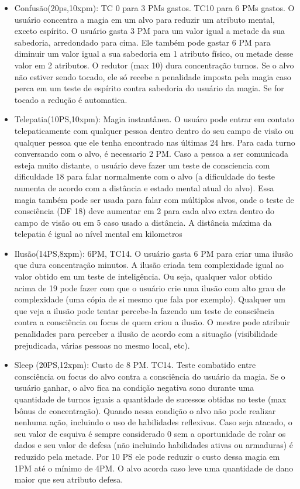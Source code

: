 \begin{itemize}
	\item Confusão(20ps,10xpm): TC 0 para 3 PMs gastos. TC10 para 6 PMs gastos.\newline 
O usuário concentra a magia em um alvo para reduzir um atributo mental, exceto espírito. O usuário gasta 3 PM para um valor igual a metade da sua sabedoria, arredondado para cima. Ele também pode gastar 6 PM para diminuir um valor igual a sua sabedoria em 1 atributo físico, ou metade desse valor em 2 atributos. O redutor (max 10) dura concentração turnos. Se o alvo não estiver sendo tocado, ele só recebe a penalidade imposta pela magia caso perca em um teste de espírito contra sabedoria do usuário da magia. Se for tocado a redução é automatica.

	\item Telepatia(10PS,10xpm): Magia instantânea.\newline 
O usuáro pode entrar em contato telepaticamente com qualquer pessoa dentro dentro do seu campo de visão ou qualquer pessoa que ele tenha encontrado nas últimas 24 hrs. Para cada turno conversando com o alvo, é necessario 2 PM. Caso a pessoa a ser comunicada esteja muito distante, o usuário deve fazer um teste de consciencia com dificuldade 18 para falar normalmente com o alvo (a dificuldade do teste aumenta de acordo com a distância e estado mental atual do alvo). Essa magia também pode ser usada para falar com múltiplos alvos, onde o teste de consciência (DF 18) deve aumentar em 2 para cada alvo extra dentro do campo de visão ou em 5 caso usado a distância. A distância máxima da telepatia é igual ao nível mental em kilometros

	\item Ilusão(14PS,8xpm): 6PM, TC14.\newline 
	O usuário gasta 6 PM para criar uma ilusão que dura concentração minutos. A ilusão criada tem complexidade igual ao valor obtido em um teste de inteligência. Ou seja, qualquer valor obtido acima de 19 pode fazer com que o usuário crie uma ilusão com alto grau de complexidade (uma cópia de si mesmo que fala por exemplo). Qualquer um que veja a ilusão pode tentar percebe-la fazendo um teste de consciência contra a consciência ou focus de quem criou a ilusão. O mestre pode atribuir penalidades para perceber a ilusão de acordo com a situação (visibilidade prejudicada, várias pessoas no mesmo local, etc). 

	\item Sleep (20PS,12xpm): Custo de 8 PM. TC14.\newline
Teste combatido entre consciência ou focus do alvo contra a consciência do usuário da magia. Se o usuário ganhar, o alvo fica na condição negativa sono durante uma quantidade de turnos iguais a quantidade de sucessos obtidas no teste (max bônus de concentração). Quando nessa condição o alvo não pode realizar nenhuma ação, incluindo o uso de habilidades reflexivas. Caso seja atacado, o seu valor de esquiva é sempre considerado 0 sem a oportunidade de rolar os dados e seu valor de defesa (não incluindo habilidades ativas ou armaduras) é reduzido pela metade. Por 10 PS ele pode reduzir o custo dessa magia em 1PM até o mínimo de 4PM. O alvo acorda caso leve uma quantidade de dano maior que seu atributo defesa. 



\end{itemize}
